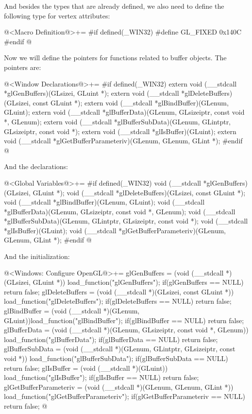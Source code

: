 And besides the types that are already defined, we also need to define
the following type for vertex attributes:

\iniciocodigo
@<Macro Definition@>+=
#if defined(_WIN32)
#define GL_FIXED          0x140C
#endif
@
\fimcodigo

Now we will define the pointers for functions related to buffer
objects. The pointers are:

\iniciocodigo
@<Window Declarations@>+=
#if defined(_WIN32)
extern void (__stdcall *glGenBuffers)(GLsizei, GLuint *);
extern void (__stdcall *glDeleteBuffers)(GLsizei, const GLuint *);
extern void (__stdcall *glBindBuffer)(GLenum, GLuint);
extern void (__stdcall *glBufferData)(GLenum, GLsizeiptr, const void *, GLenum);
extern void (__stdcall *glBufferSubData)(GLenum, GLintptr, GLsizeiptr,
                                         const void *);
extern void (__stdcall *glIsBuffer)(GLuint);
extern void (__stdcall *glGetBufferParameteriv)(GLenum, GLenum, GLint *);
#endif
@
\fimcodigo

And the declarations:

\iniciocodigo
@<Global Variables@>+=
#if defined(_WIN32)
void (__stdcall *glGenBuffers)(GLsizei, GLuint *);
void (__stdcall *glDeleteBuffers)(GLsizei, const GLuint *);
void (__stdcall *glBindBuffer)(GLenum, GLuint);
void (__stdcall *glBufferData)(GLenum, GLsizeiptr, const void *, GLenum);
void (__stdcall *glBufferSubData)(GLenum, GLintptr, GLsizeiptr, const void *);
void (__stdcall *glIsBuffer)(GLuint);
void (__stdcall *glGetBufferParameteriv)(GLenum, GLenum, GLint *);
#endif
@
\fimcodigo

And the initialization:

\iniciocodigo
@<Windows: Configure OpenGL@>+=
glGenBuffers = (void (__stdcall *)(GLsizei, GLuint *))
                 load_function("glGenBuffers");
if(glGenBuffers == NULL) return false;
glDeleteBuffers = (void (__stdcall *)(GLsizei, const GLuint *))
                    load_function("glDeleteBuffers");
if(glDeleteBuffers == NULL) return false;
glBindBuffer = (void (__stdcall *)(GLenum, GLuint))load_function("glBindBuffer");
if(glBindBuffer == NULL) return false;
glBufferData = (void (__stdcall *)(GLenum, GLsizeiptr, const void *, GLenum))
                 load_function("glBufferData");
if(glBufferData == NULL) return false;
glBufferSubData = (void (__stdcall *)(GLenum, GLintptr, GLsizeiptr, const void *))
                    load_function("glBufferSubData");
if(glBufferSubData == NULL) return false;
glIsBuffer = (void (__stdcall *)(GLuint)) load_function("glIsBuffer");
if(glIsBuffer == NULL) return false;
glGetBufferParameteriv = (void (__stdcall *)(GLenum, GLenum, GLint *))
                           load_function("glGetBufferParameteriv");
if(glGetBufferParameteriv == NULL) return false;
@
\fimcodigo

